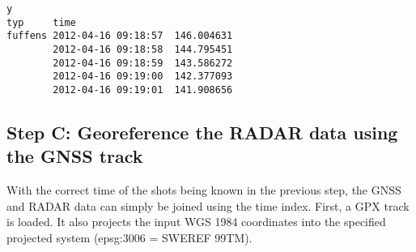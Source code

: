 \documentclass[11pt]{article}
\begin{document}
    \begin{Verbatim}[commandchars=\\\{\}]
                                      y
typ     time                           
fuffens 2012-04-16 09:18:57  146.004631
        2012-04-16 09:18:58  144.795451
        2012-04-16 09:18:59  143.586272
        2012-04-16 09:19:00  142.377093
        2012-04-16 09:19:01  141.908656

    \end{Verbatim}

    \subsection{Step C: Georeference the RADAR data using the GNSS
track}\label{step-c-georeference-the-radar-data-using-the-gnss-track}

With the correct time of the shots being known in the previous step, the
GNSS and RADAR data can simply be joined using the time index. First, a
GPX track is loaded. It also projects the input WGS 1984 coordinates
into the specified projected system (epsg:3006 = SWEREF 99TM).
\end{document}
